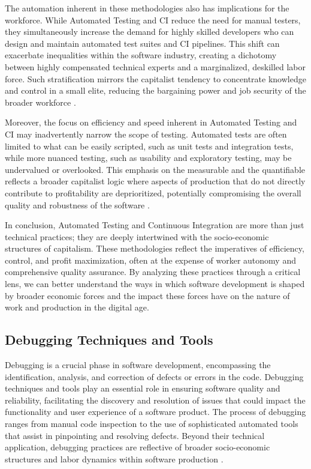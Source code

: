\begin{refsection}
The automation inherent in these methodologies also has implications for the workforce. While Automated Testing and CI reduce the need for manual testers, they simultaneously increase the demand for highly skilled developers who can design and maintain automated test suites and CI pipelines. This shift can exacerbate inequalities within the software industry, creating a dichotomy between highly compensated technical experts and a marginalized, deskilled labor force. Such stratification mirrors the capitalist tendency to concentrate knowledge and control in a small elite, reducing the bargaining power and job security of the broader workforce \cite[pp.~118-123]{huws2014labor}.

Moreover, the focus on efficiency and speed inherent in Automated Testing and CI may inadvertently narrow the scope of testing. Automated tests are often limited to what can be easily scripted, such as unit tests and integration tests, while more nuanced testing, such as usability and exploratory testing, may be undervalued or overlooked. This emphasis on the measurable and the quantifiable reflects a broader capitalist logic where aspects of production that do not directly contribute to profitability are deprioritized, potentially compromising the overall quality and robustness of the software \cite[pp.~115-120]{kaner1999testing}.

In conclusion, Automated Testing and Continuous Integration are more than just technical practices; they are deeply intertwined with the socio-economic structures of capitalism. These methodologies reflect the imperatives of efficiency, control, and profit maximization, often at the expense of worker autonomy and comprehensive quality assurance. By analyzing these practices through a critical lens, we can better understand the ways in which software development is shaped by broader economic forces and the impact these forces have on the nature of work and production in the digital age.

\subsection{Debugging Techniques and Tools}

Debugging is a crucial phase in software development, encompassing the identification, analysis, and correction of defects or errors in the code. Debugging techniques and tools play an essential role in ensuring software quality and reliability, facilitating the discovery and resolution of issues that could impact the functionality and user experience of a software product. The process of debugging ranges from manual code inspection to the use of sophisticated automated tools that assist in pinpointing and resolving defects. Beyond their technical application, debugging practices are reflective of broader socio-economic structures and labor dynamics within software production \cite[pp.~15-20]{mcconnell2007code}.


\end{refsection}

